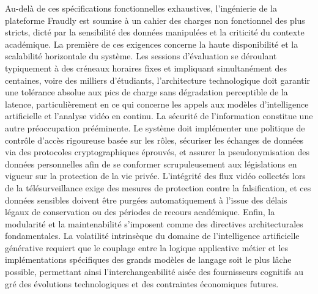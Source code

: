 Au-delà de ces spécifications fonctionnelles exhaustives, l'ingénierie de la plateforme Fraudly est soumise à un cahier des charges non fonctionnel des plus stricts, dicté par la sensibilité des données manipulées et la criticité du contexte académique. La première de ces exigences concerne la haute disponibilité et la scalabilité horizontale du système. Les sessions d'évaluation se déroulant typiquement à des créneaux horaires fixes et impliquant simultanément des centaines, voire des milliers d'étudiants, l'architecture technologique doit garantir une tolérance absolue aux pics de charge sans dégradation perceptible de la latence, particulièrement en ce qui concerne les appels aux modèles d'intelligence artificielle et l'analyse vidéo en continu. La sécurité de l'information constitue une autre préoccupation prééminente. Le système doit implémenter une politique de contrôle d'accès rigoureuse basée sur les rôles, sécuriser les échanges de données via des protocoles cryptographiques éprouvés, et assurer la pseudonymisation des données personnelles afin de se conformer scrupuleusement aux législations en vigueur sur la protection de la vie privée. L'intégrité des flux vidéo collectés lors de la télésurveillance exige des mesures de protection contre la falsification, et ces données sensibles doivent être purgées automatiquement à l'issue des délais légaux de conservation ou des périodes de recours académique. Enfin, la modularité et la maintenabilité s'imposent comme des directives architecturales fondamentales. La volatilité intrinsèque du domaine de l'intelligence artificielle générative requiert que le couplage entre la logique applicative métier et les implémentations spécifiques des grands modèles de langage soit le plus lâche possible, permettant ainsi l'interchangeabilité aisée des fournisseurs cognitifs au gré des évolutions technologiques et des contraintes économiques futures.
